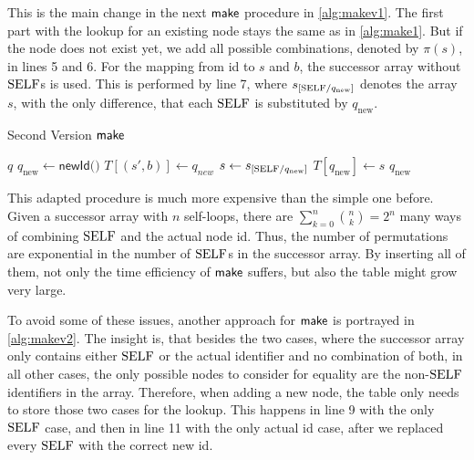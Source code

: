 This is the main change in the next $\operatorname{\textsf{make}}$ procedure in \autoref{alg:makev1}. The first part with the lookup for an existing node stays the same as in \autoref{alg:make1}. But if the node does not exist yet, we add all possible combinations, denoted by $\pi(s)$, in lines 5 and 6. For the mapping from id to $s$ and $b$, the successor array without $\mathrm{SELF}$s is used. This is performed by line 7, where $s_{[\mathrm{SELF} / q_{\text{new}}]}$ denotes the array $s$, with the only difference, that each $\mathrm{SELF}$ is substituted by $q_{\text{new}}$. 
\par
\begin{algorithm}[htb]
\centering
\caption{Second Version $\operatorname{\textsf{make}}$}\label{alg:makev1}
\begin{algorithmic}[1]
\Return $q$
\Else
\State $q_{\text{new}} \gets \textsf{newId()}$
\State $T[(s',b)] \gets q_{new}$
\EndFor
\State $s \gets s_{[\mathrm{SELF} / q_{\text{new}}]}$
\State $T[q_{\text{new}}] \gets s$
\Return $q_{\text{new}}$
\EndIf
\end{algorithmic}
\end{algorithm}
This adapted procedure is much more expensive than the simple one before. Given a successor array with $n$ self-loops, there are $\sum_{k=0}^{n} \binom{n}{k} = 2^{n}$ many ways of combining $\mathrm{SELF}$ and the actual node id. Thus, the number of permutations are exponential in the number of $\mathrm{SELF}$s in the successor array. By inserting all of them, not only the time efficiency of $\operatorname{\textsf{make}}$ suffers, but also the table might grow very large.
\par
To avoid some of these issues, another approach for $\operatorname{\textsf{make}}$ is portrayed in \autoref{alg:makev2}. 
The insight is, that besides the two cases, where the successor array only contains either $\mathrm{SELF}$ or the actual identifier and no combination of both, in all other cases, the only possible nodes to consider for equality are the non-$\mathrm{SELF}$ identifiers in the array. Therefore, when adding a new node, the table only needs to store those two cases for the lookup. This happens in line 9 with the only $\mathrm{SELF}$ case, and then in line 11 with the only actual id case, after we replaced every $\mathrm{SELF}$ with the correct new id.
